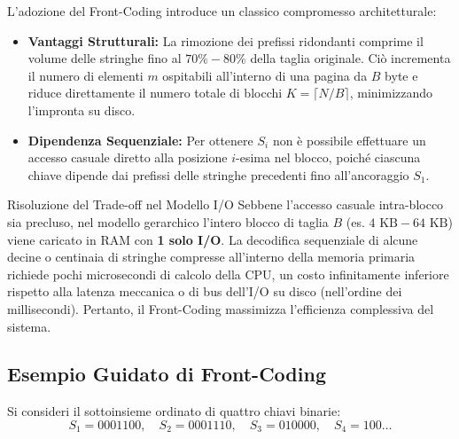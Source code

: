 L'adozione del Front-Coding introduce un classico compromesso architetturale:
\begin{itemize}
  \item \textbf{Vantaggi Strutturali:} La rimozione dei prefissi ridondanti comprime il volume delle stringhe fino al $70\%-80\%$ della taglia originale. Ci\`o incrementa il numero di elementi $m$ ospitabili all'interno di una pagina da $B$ byte e riduce direttamente il numero totale di blocchi $K = \lceil N/B \rceil$, minimizzando l'impronta su disco.
  \item \textbf{Dipendenza Sequenziale:} Per ottenere $S_i$ non \`e possibile effettuare un accesso casuale diretto alla posizione $i$-esima nel blocco, poich\'e ciascuna chiave dipende dai prefissi delle stringhe precedenti fino all'ancoraggio $S_1$.
\end{itemize}

\begin{noteblock}{Risoluzione del Trade-off nel Modello I/O}
Sebbene l'accesso casuale intra-blocco sia precluso, nel modello gerarchico l'intero blocco di taglia $B$ (es. $4\text{ KB} - 64\text{ KB}$) viene caricato in RAM con \textbf{1 solo I/O}.
La decodifica sequenziale di alcune decine o centinaia di stringhe compresse all'interno della memoria primaria richiede pochi microsecondi di calcolo della CPU, un costo infinitamente inferiore rispetto alla latenza meccanica o di bus dell'I/O su disco (nell'ordine dei millisecondi). Pertanto, il Front-Coding massimizza l'efficienza complessiva del sistema.
\end{noteblock}

\FloatBarrier
\subsection{Esempio Guidato di Front-Coding}
\label{subsec:esempio-guidato-front-coding}

Si consideri il sottoinsieme ordinato di quattro chiavi binarie:
\begin{equation}
  S_1 = 0001100, \quad S_2 = 0001110, \quad S_3 = 010000, \quad S_4 = 100\dots
\end{equation}

